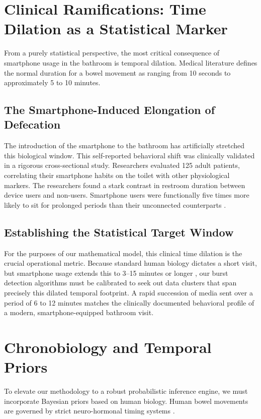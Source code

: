 \documentclass[twocolumn]{article}
\begin{document}
\section{Clinical Ramifications: Time Dilation as a Statistical Marker}
From a purely statistical perspective, the most critical consequence of smartphone usage in the bathroom is temporal dilation. Medical literature defines the normal duration for a bowel movement as ranging from 10 seconds to approximately 5 to 10 minutes.

\subsection{The Smartphone-Induced Elongation of Defecation}
The introduction of the smartphone to the bathroom has artificially stretched this biological window. This self-reported behavioral shift was clinically validated in a rigorous cross-sectional study. Researchers evaluated 125 adult patients, correlating their smartphone habits on the toilet with other physiological markers. The researchers found a stark contrast in restroom duration between device users and non-users. Smartphone users were functionally five times more likely to sit for prolonged periods than their unconnected counterparts \cite{ramprasad2025}.

\subsection{Establishing the Statistical Target Window}
For the purposes of our mathematical model, this clinical time dilation is the crucial operational metric. Because standard human biology dictates a short visit, but smartphone usage extends this to 3--15 minutes or longer \cite{ramprasad2025}, our burst detection algorithms must be calibrated to seek out data clusters that span precisely this dilated temporal footprint. A rapid succession of media sent over a period of 6 to 12 minutes matches the clinically documented behavioral profile of a modern, smartphone-equipped bathroom visit.

\section{Chronobiology and Temporal Priors}
To elevate our methodology to a robust probabilistic inference engine, we must incorporate Bayesian priors based on human biology. Human bowel movements are governed by strict neuro-hormonal timing systems \cite{hibberd2023}.
\end{document}
